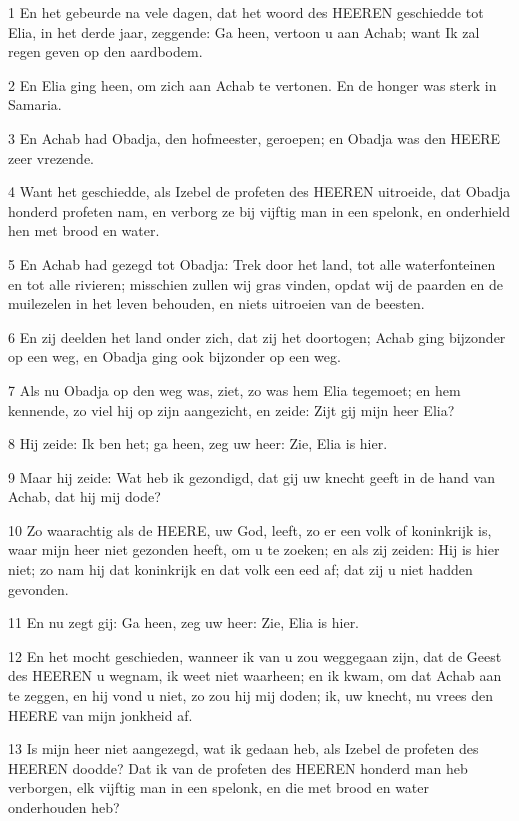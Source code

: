 \par 1 En het gebeurde na vele dagen, dat het woord des HEEREN geschiedde tot Elia, in het derde jaar, zeggende: Ga heen, vertoon u aan Achab; want Ik zal regen geven op den aardbodem.
\par 2 En Elia ging heen, om zich aan Achab te vertonen. En de honger was sterk in Samaria.
\par 3 En Achab had Obadja, den hofmeester, geroepen; en Obadja was den HEERE zeer vrezende.
\par 4 Want het geschiedde, als Izebel de profeten des HEEREN uitroeide, dat Obadja honderd profeten nam, en verborg ze bij vijftig man in een spelonk, en onderhield hen met brood en water.
\par 5 En Achab had gezegd tot Obadja: Trek door het land, tot alle waterfonteinen en tot alle rivieren; misschien zullen wij gras vinden, opdat wij de paarden en de muilezelen in het leven behouden, en niets uitroeien van de beesten.
\par 6 En zij deelden het land onder zich, dat zij het doortogen; Achab ging bijzonder op een weg, en Obadja ging ook bijzonder op een weg.
\par 7 Als nu Obadja op den weg was, ziet, zo was hem Elia tegemoet; en hem kennende, zo viel hij op zijn aangezicht, en zeide: Zijt gij mijn heer Elia?
\par 8 Hij zeide: Ik ben het; ga heen, zeg uw heer: Zie, Elia is hier.
\par 9 Maar hij zeide: Wat heb ik gezondigd, dat gij uw knecht geeft in de hand van Achab, dat hij mij dode?
\par 10 Zo waarachtig als de HEERE, uw God, leeft, zo er een volk of koninkrijk is, waar mijn heer niet gezonden heeft, om u te zoeken; en als zij zeiden: Hij is hier niet; zo nam hij dat koninkrijk en dat volk een eed af; dat zij u niet hadden gevonden.
\par 11 En nu zegt gij: Ga heen, zeg uw heer: Zie, Elia is hier.
\par 12 En het mocht geschieden, wanneer ik van u zou weggegaan zijn, dat de Geest des HEEREN u wegnam, ik weet niet waarheen; en ik kwam, om dat Achab aan te zeggen, en hij vond u niet, zo zou hij mij doden; ik, uw knecht, nu vrees den HEERE van mijn jonkheid af.
\par 13 Is mijn heer niet aangezegd, wat ik gedaan heb, als Izebel de profeten des HEEREN doodde? Dat ik van de profeten des HEEREN honderd man heb verborgen, elk vijftig man in een spelonk, en die met brood en water onderhouden heb?
